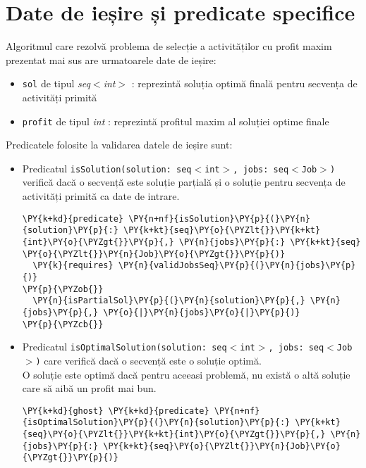 \section{Date de ieșire și predicate specifice }
Algoritmul care rezolvă problema de selecție a activităților cu profit maxim prezentat mai sus are urmatoarele date de ieșire:
\begin{itemize}
    \item \texttt{sol} de tipul {\textit{seq$<$int$>$}} : reprezintă soluția optimă finală pentru secvența de activități primită 
    \item \texttt{profit} de tipul \textit{int} : reprezintă profitul maxim al soluției optime finale
\end{itemize}

Predicatele folosite la validarea datele de ieșire sunt:
\begin{itemize}
    \item Predicatul \texttt{isSolution(solution: seq$<$int$>$, jobs: seq$<$Job$>$)} verifică dacă o secvență este soluție parțială și o soluție pentru secvența de activități primită ca date de intrare.
    \begin{Verbatim}[commandchars=\\\{\}, fontsize=\footnotesize]
\PY{k+kd}{predicate} \PY{n+nf}{isSolution}\PY{p}{(}\PY{n}{solution}\PY{p}{:} \PY{k+kt}{seq}\PY{o}{\PYZlt{}}\PY{k+kt}{int}\PY{o}{\PYZgt{}}\PY{p}{,} \PY{n}{jobs}\PY{p}{:} \PY{k+kt}{seq} \PY{o}{\PYZlt{}}\PY{n}{Job}\PY{o}{\PYZgt{}}\PY{p}{)}
  \PY{k}{requires} \PY{n}{validJobsSeq}\PY{p}{(}\PY{n}{jobs}\PY{p}{)}
\PY{p}{\PYZob{}}
  \PY{n}{isPartialSol}\PY{p}{(}\PY{n}{solution}\PY{p}{,} \PY{n}{jobs}\PY{p}{,} \PY{o}{|}\PY{n}{jobs}\PY{o}{|}\PY{p}{)}
\PY{p}{\PYZcb{}}
\end{Verbatim}
    \item Predicatul \texttt{isOptimalSolution(solution: seq$<$int$>$, jobs: seq$<$Job$>$)} care verifică dacă o secvență este o soluție optimă.\\
    O soluție este optimă dacă pentru aceeasi problemă, nu există o altă soluție care să aibă un profit mai bun.
    \begin{footnotesize}
    \begin{Verbatim}[commandchars=\\\{\}, fontsize=\footnotesize]
\PY{k+kd}{ghost} \PY{k+kd}{predicate} \PY{n+nf}{isOptimalSolution}\PY{p}{(}\PY{n}{solution}\PY{p}{:} \PY{k+kt}{seq}\PY{o}{\PYZlt{}}\PY{k+kt}{int}\PY{o}{\PYZgt{}}\PY{p}{,} \PY{n}{jobs}\PY{p}{:} \PY{k+kt}{seq}\PY{o}{\PYZlt{}}\PY{n}{Job}\PY{o}{\PYZgt{}}\PY{p}{)}

\end{Verbatim}
\end{footnotesize}
\end{itemize}
